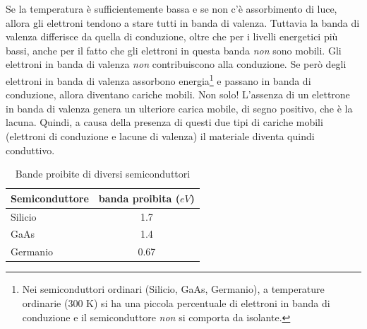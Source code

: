 \documentclass[17pt]{extarticle}
\begin{document}
Se la temperatura è sufficientemente bassa e se non c'è assorbimento di luce, allora gli elettroni tendono a stare tutti in banda di valenza. Tuttavia la banda di valenza differisce da quella di conduzione, oltre che per i livelli energetici più bassi, anche per il fatto che gli elettroni in questa banda \emph{non} sono mobili. Gli elettroni in banda di valenza \emph{non} contribuiscono alla conduzione. Se però degli elettroni in banda di valenza assorbono energia\footnote{Nei semiconduttori ordinari (Silicio, GaAs, Germanio), a temperature ordinarie (300 K) si ha una piccola percentuale di elettroni in banda di conduzione e il semiconduttore \emph{non} si comporta da isolante. } e passano in banda di conduzione, allora diventano cariche mobili. Non solo! L'assenza di un elettrone in banda di valenza genera un ulteriore carica mobile, di segno positivo, che è la lacuna. 
Quindi, a causa della presenza di questi due tipi di cariche mobili (elettroni di conduzione e lacune di valenza) il materiale diventa quindi conduttivo.



\begin{table}[t]
\centering
\begin{tabular}{|l|c|}
\hline
Semiconduttore & banda proibita ($eV$) \\
\hline
Silicio & 1.7\\
GaAs & 1.4\\
Germanio & 0.67\\
\hline
\end{tabular}
\caption{Bande proibite di diversi semiconduttori}
\label{tab:template}
\end{table}
\end{document}
